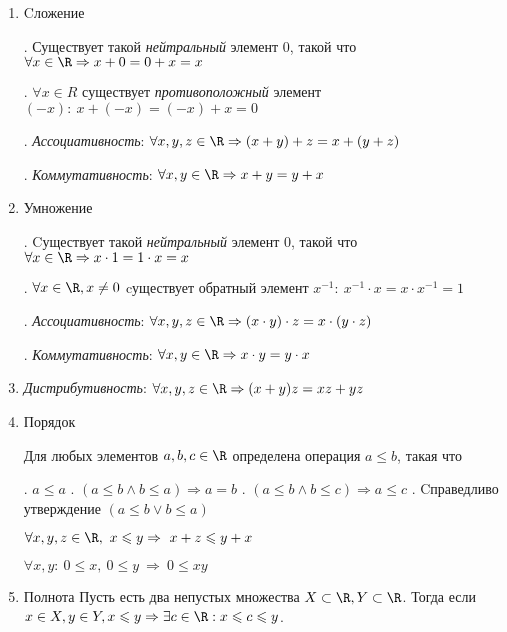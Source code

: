 \begin{enumerate}
	\item Cложение
	
	. Существует такой \textit{нейтральный} элемент 0, такой что $\forall x \in \R \Rightarrow x + 0 = 0 + x = x$
	
	. $\forall x \in R $ существует \textit{противоположный} элемент $ (-x): \  x + (-x) = (-x) + x = 0$
	
	. \textit{Ассоциативность}: $\forall x, y, z \in \R \Rightarrow (x + y) + z = x + (y + z)$
	
	. \textit{Коммутативность}: $\forall x, y \in \R \Rightarrow x + y = y + x$
	
	
	\item Умножение
	
	. Cуществует такой \textit{нейтральный} элемент 0, такой что $\forall x \in \R \Rightarrow x \cdot 1 = 1 \cdot x = x$
	
	. $\forall x \in \R, x \neq 0$ cуществует обратный элемент $x^{-1}: \ x^{-1} \cdot x = x \cdot x^{-1} = 1$
	
	. \textit{Ассоциативность}: $\forall x, y, z \in \R \Rightarrow (x \cdot y) \cdot z = x \cdot (y \cdot z)$
	
	. \textit{Коммутативность}: $\forall x, y \in \R \Rightarrow x \cdot y = y \cdot x$
	
	\item \textit{Дистрибутивность}: $\forall x, y, z \in \R \Rightarrow (x + y)z = xz + yz$
	
	\item Порядок
			
	Для любых элементов $a, b, c \in \R$ определена операция $a \leqslant b$, такая что
	
	. $a \leqslant a$
	. $(a \leqslant b \land b \leqslant a) \Rightarrow a = b$
	. $(a \leqslant b \land b \leqslant c) \Rightarrow a \leqslant c$
	. Cправедливо утверждение $(a \leqslant b \lor b \leqslant a)$
	
	\subitem $\forall x, y, z \in \R, \ x \leqslant y \Rightarrow \ x + z \leqslant y + x$
	
	\subitem $\forall x, y: \ 0 \leqslant x, \ 0 \leqslant y \  \Rightarrow  \ 0 \leqslant xy$
			
	\item Полнота
	Пусть есть два непустых множества $X \subset \R, Y \subset \R$. Тогда если $ x \in X, y \in Y, x \leqslant y \Rightarrow \exists c \in \R: x \leqslant c \leqslant y$.
\end{enumerate}



